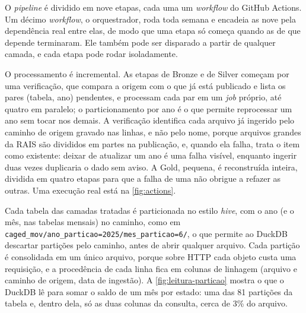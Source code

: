 O \textit{pipeline} é dividido em nove etapas, cada uma um \textit{workflow} do GitHub Actions. Um décimo \textit{workflow}, o orquestrador, roda toda semana e encadeia as nove pela dependência real entre elas, de modo que uma etapa só começa quando as de que depende terminaram. Ele também pode ser disparado a partir de qualquer camada, e cada etapa pode rodar isoladamente.

O processamento é incremental. As etapas de Bronze e de Silver começam por uma verificação, que compara a origem com o que já está publicado e lista os pares (tabela, ano) pendentes, e processam cada par em um \textit{job} próprio, até quatro em paralelo; o particionamento por ano é o que permite reprocessar um ano sem tocar nos demais. A verificação identifica cada arquivo já ingerido pelo caminho de origem gravado nas linhas, e não pelo nome, porque arquivos grandes da RAIS são divididos em partes na publicação, e, quando ela falha, trata o item como existente: deixar de atualizar um ano é uma falha visível, enquanto ingerir duas vezes duplicaria o dado sem aviso. A Gold, pequena, é reconstruída inteira, dividida em quatro etapas para que a falha de uma não obrigue a refazer as outras. Uma execução real está na \autoref{fig:actions}.

Cada tabela das camadas tratadas é particionada no estilo \textit{hive}, com o ano (e o mês, nas tabelas mensais) no caminho, como em \nolinkurl{caged_mov/ano_particao=2025/mes_particao=6/}, o que permite ao DuckDB descartar partições pelo caminho, antes de abrir qualquer arquivo. Cada partição é consolidada em um único arquivo, porque sobre HTTP cada objeto custa uma requisição, e a procedência de cada linha fica em colunas de linhagem (arquivo e caminho de origem, data de ingestão). A \autoref{fig:leitura-particao} mostra o que o DuckDB lê para somar o saldo de um mês por estado: uma das 81 partições da tabela e, dentro dela, só as duas colunas da consulta, cerca de 3\% do arquivo.

